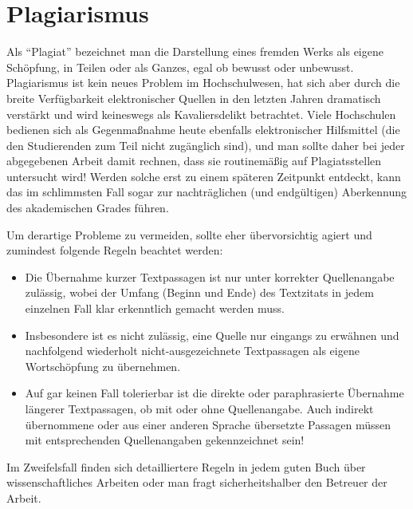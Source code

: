 %




\section{Plagiarismus}
\label{sec:Plagiarismus}

Als "`Plagiat"' bezeichnet man die Darstellung eines fremden Werks als eigene Schöpfung, 
in Teilen oder als Ganzes, egal ob bewusst oder unbewusst.
Plagiarismus ist kein neues Problem im Hochschulwesen, hat sich aber durch die 
breite Verfügbarkeit elektronischer Quellen in den letzten Jahren dramatisch 
verstärkt und wird keineswegs als Kavaliersdelikt betrachtet.
Viele Hochschulen bedienen sich als Gegenmaßnahme heute ebenfalls elektronischer Hilfsmittel 
(die den Studierenden zum Teil nicht zugänglich sind), und man sollte daher bei jeder 
abgegebenen Arbeit damit rechnen, dass sie routinemäßig auf Plagiatsstellen untersucht wird!
Werden solche erst zu einem späteren Zeitpunkt entdeckt, kann das im schlimmsten Fall sogar 
zur nachträglichen (und endgültigen) Aberkennung des akademischen Grades führen.

Um derartige Probleme zu vermeiden, sollte eher übervorsichtig agiert und zumindest folgende Regeln beachtet werden:
%
\begin{itemize}
\item
Die Übernahme kurzer Textpassagen ist nur unter korrekter Quellenangabe zulässig, wobei der Umfang (Beginn und Ende) des Textzitats in jedem einzelnen Fall klar erkenntlich gemacht werden muss. 
\item
Insbesondere ist es nicht zulässig, eine Quelle nur eingangs zu erwähnen und nachfolgend wiederholt nicht-ausgezeichnete Textpassagen als eigene Wortschöpfung zu übernehmen. 
\item
Auf gar keinen Fall tolerierbar ist die direkte oder paraphrasierte Übernahme längerer Textpassagen, ob mit oder ohne Quellenangabe. Auch indirekt übernommene oder aus einer anderen Sprache übersetzte Passagen müssen mit entsprechenden Quellenangaben gekennzeichnet sein! 
\end{itemize}
%
Im Zweifelsfall finden sich detailliertere Regeln in jedem guten Buch über wissenschaftliches Arbeiten oder man fragt sicherheitshalber den Betreuer der Arbeit.


